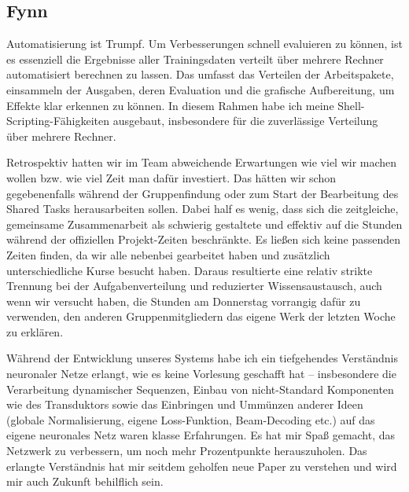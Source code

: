 \documentclass[11pt,a4paper]{article}
\begin{document}
\subsection{Fynn}
Automatisierung ist Trumpf.
Um Verbesserungen schnell evaluieren zu können, ist es essenziell die Ergebnisse aller Trainingsdaten verteilt über mehrere Rechner automatisiert berechnen zu lassen.
Das umfasst das Verteilen der Arbeitspakete, einsammeln der Ausgaben, deren Evaluation und die grafische Aufbereitung, um Effekte klar erkennen zu können.
In diesem Rahmen habe ich meine Shell-Scripting-Fähigkeiten ausgebaut, insbesondere für die zuverlässige Verteilung über mehrere Rechner.

Retrospektiv hatten wir im Team abweichende Erwartungen wie viel wir machen wollen bzw. wie viel Zeit man dafür investiert.
Das hätten wir schon gegebenenfalls während der Gruppenfindung oder zum Start der Bearbeitung des Shared Tasks herausarbeiten sollen.
Dabei half es wenig, dass sich die zeitgleiche, gemeinsame Zusammenarbeit als schwierig gestaltete und effektiv auf die Stunden während der offiziellen Projekt-Zeiten beschränkte.
Es ließen sich keine passenden Zeiten finden, da wir alle nebenbei gearbeitet haben und zusätzlich unterschiedliche Kurse besucht haben.
Daraus resultierte eine relativ strikte Trennung bei der Aufgabenverteilung und reduzierter Wissensaustausch, auch wenn wir versucht haben, die Stunden am Donnerstag vorrangig dafür zu verwenden, den anderen Gruppenmitgliedern das eigene Werk der letzten Woche zu erklären.

Während der Entwicklung unseres Systems habe ich ein tiefgehendes Verständnis neuronaler Netze erlangt, wie es keine Vorlesung geschafft hat -- insbesondere die Verarbeitung dynamischer Sequenzen, Einbau von nicht-Standard Komponenten wie des Transduktors sowie das Einbringen und Ummünzen anderer Ideen (globale Normalisierung, eigene Loss-Funktion, Beam-Decoding etc.) auf das eigene neuronales Netz waren klasse Erfahrungen.
Es hat mir Spaß gemacht, das Netzwerk zu verbessern, um noch mehr Prozentpunkte herauszuholen.
Das erlangte Verständnis hat mir seitdem geholfen neue Paper zu verstehen und wird mir auch Zukunft behilflich sein.

\end{document}
